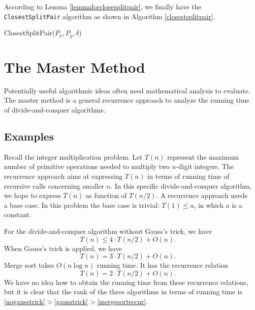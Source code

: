 According to Lemma \ref{lemmaforclosesplitpair}, we finally have the \texttt{ClosestSplitPair} algorithm as shown in Algorithm \ref{closestsplitpair}.
\begin{algorithm}[ht]
\caption{ClosestSplitPair($P_x,P_y,\delta$)}\label{closestsplitpair}
\begin{algorithmic}[1]
\Input{}
\Output{}
\EndIf
\EndFor
\EndFor
\end{algorithmic}
\end{algorithm}
\section{The Master Method}
Potentially useful algorithmic ideas often need mathematical analysis to evaluate. The master method is a general recurrence approach to analyze the running time of divide-and-conquer algorithms. 
\subsection{Examples}
Recall the integer multiplication problem. Let $T(n)$ represent the maximum number of primitive operations needed to multiply two $n$-digit integers. The recurrence approach aims at expressing $T(n)$ in terms of running time of recursive calls concerning smaller $n$. In this specific divide-and-conquer algorithm, we hope to express $T(n)$ as function of $T(n/2)$. A recurrence approach needs a base case. In this problem the base case is trivial: $T(1)\leq a$, in which $a$ is a constant.

For the divide-and-conquer algorithm without Gauss's trick, we have 
\begin{equation}\label{nogausstrick}
T(n)\leq 4\cdot T(n/2)+O(n).
\end{equation}
When Gauss's trick is applied, we have 
\begin{equation}\label{gausstrick}
T(n)=3\cdot T(n/2)+O(n).
\end{equation}
Merge sort takes $O(n\log n)$ running time. It has the recurrence relation
\begin{equation}\label{mergesortrecur}
T(n)=2\cdot T(n/2)+O(n).
\end{equation}
We have no idea how to obtain the running time from these recurrence relations, but it is clear that the rank of the three algorithms in terms of running time is \eqref{nogausstrick}$>$\eqref{gausstrick}$>$\eqref{mergesortrecur}.
